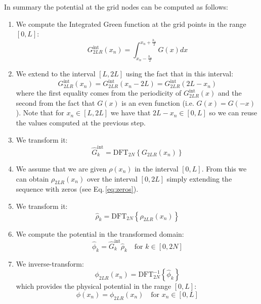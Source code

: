 In summary the potential at the grid nodes can be computed as follows:
\begin{enumerate}
\item We compute the Integrated Green function at the grid points in the range $[0, L]$:
\begin{equation}
G_{2LR}^\text{int}(x_n) = \int_{x_n-\frac{h_x}{2}}^{x_n+\frac{h_x}{2}} G(x) dx
\end{equation}
\item We extend to the interval $[L, 2L]$ using the fact that in this interval:
\begin{equation}
G^\text{int}_{2LR}(x_n) = G^\text{int}_{2LR}(x_n-2L) =  G^\text{int}_{2LR}(2L-x_n)
\end{equation}
where the first equality comes from the periodicity of $G^\text{int}_{2LR}(x)$ and the second from the fact that $G(x)$ is an even function (i.e. $G(x) = G(-x)$).
Note that for $x_n \in [L, 2L]$ we have that $2L-x_n \in [0, L]$ so we can reuse the values computed at the previous step.
\item We transform it:
\begin{equation}
\hat{G}^\text{int}_k = \text{DFT}_{2N}\left\{ G_{2LR}(x_n)\right\}
\end{equation}
\item We assume that we are given $\rho(x_n)$ in the interval $[0, L]$. From this we can obtain $\rho_{2LR}(x_n)$ over the interval $[0, 2L]$ simply extending the sequence with zeros (see Eq.\,\eqref{eq:zeros}).
\item We transform it:
\begin{equation}
\hat{\rho}_k = \text{DFT}_{2N}\left\{ \rho_{2LR}(x_n)\right\}
\end{equation}
\item We compute the potential in the transformed domain:
\begin{equation}
\hat{\phi}_k = \hat{G}^\text{int}_k \hat{\rho}_k \quad \text{for } k\in [0, 2N]
\end{equation}
\item We inverse-transform:
\begin{equation}
\phi_{2LR}(x_n)  = \text{DFT}_{2N}^{-1}\left\{\hat{\phi}_k\right\}
\end{equation}
which provides the physical potential in the range $[0, L]$:
\begin{equation}
\phi(x_n)  = \phi_{2LR}(x_n)  \quad \text{for } x_n\in [0, L]
\end{equation}
\end{enumerate}

